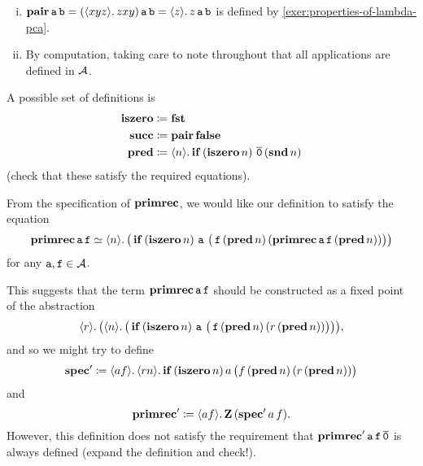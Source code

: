 

\begin{enumerate}[(i)]
  \item
    \( \pcapair \pca a \pca b =
      (\lambdapca{xyz}{zxy}) \pca a \pca b =
      \lambdapca{z}{z \pca a \pca b}\)
    is defined by \cref{exer:properties-of-lambda-pca}.

  \item
    By computation, taking care to note throughout that all applications are
    defined in \(\AA\).
\end{enumerate}



A possible set of definitions is
\begin{align*}
    \pcaiszero & \defeq \pcafst \\
    \pcasucc & \defeq \pcapair \pcafalse \\
    \pcapred & \defeq \lambdapca{n}{\pcaif\,(\pcaiszero n)\,\numeral{0}\,(\pcasnd n)}
\end{align*}
(check that these satisfy the required equations).




\newcommand\spec{\pcacomb{spec}}

From the specification of  \(\pcarec\), we would like our definition to satisfy
the equation
\[ \pcarec \pca{a} \pca{f} \simeq
  \lambdapca{n}{\big(
    \pcaif \, (\pcaiszero n) \,
      \pca{a} \,
      \big(\pca{f} \, (\pcapred n) \, (\pcarec \pca{a} \pca{f} \, (\pcapred n))\big)
  \big)}
\]
for any \(\pca a, \pca f \in \AA\).

This suggests that the term \(\pcarec \pca{a} \pca{f}\) should be constructed as
a fixed point of the abstraction
\begin{equation} \label{eq:spec}
\lambdapca{r}{\big(
  \lambdapca{n}{\big(
    \pcaif \, (\pcaiszero n) \,
      \pca{a} \,
      \big(\pca{f} \, (\pcapred n) \, (r \, (\pcapred n))\big)
  \big)}
\big)},
\end{equation}
and so we might try to define
\[ \spec^\prime \defeq
\lambdapca{af}{\lambdapca{rn}{
  \pcaif \, (\pcaiszero n) \,
    a \,
    \big(f \, (\pcapred n) \, (r \, (\pcapred n))\big)
}}
\]
and
\[ \pcarec^\prime \defeq \lambdapca{af}{\pcaz \, (\spec^\prime a \, f)}. \]
However, this definition does not satisfy the requirement that
\(\pcarec^\prime \pca{a} \pca{f} \numeral{0}\) is always defined (expand the
definition and check!).


